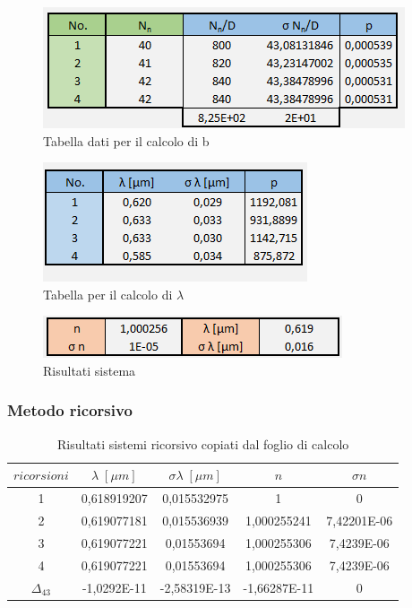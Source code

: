 \documentclass{article}
\begin{document}
\begin{figure}[h!]
  \centering
  \includegraphics[width=0.6\linewidth]{IM tabella b}
  \caption{Tabella dati per il calcolo di b}
\end{figure}

\begin{figure}[h!]
  \centering
  \includegraphics[width=0.4\linewidth]{IM tabella lambda sistema}
  \caption{Tabella per il calcolo di $\lambda$}
\end{figure}

\begin{figure}[h!]
  \centering
  \includegraphics[width=0.6\linewidth]{IM risultati sistema}
  \caption{Risultati sistema}
\end{figure}

\pagebreak 

\subsubsection{Metodo ricorsivo}

\begin{table}[h!]
\centering
\begin{tabular}{ | c | c | c | c | c | }
\hline
 $ricorsioni$ & $\lambda \; [\mu m]$ & $\sigma\lambda \; [\mu m]$ & $n$ & $\sigma n$\\
\hline
 1 & 0,618919207 & 0,015532975 & 1 & 0\\
 2 & 0,619077181 & 0,015536939 & 1,000255241 & 7,42201E-06\\
 3 & 0,619077221 & 0,01553694 & 1,000255306 & 7,4239E-06\\
 4 & 0,619077221 & 0,01553694 & 1,000255306 & 7,4239E-06\\
\hline
 $\Delta_{4 3}$ & -1,0292E-11 & -2,58319E-13 & -1,66287E-11 & 0\\
\hline
\end{tabular}
\caption{Risultati sistemi ricorsivo copiati dal foglio di calcolo}
\label{table:6}
\end{table}
\end{document}

